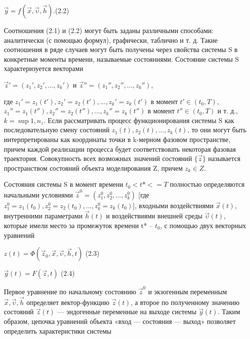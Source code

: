   \begin{center}
      $\vec{y} = f(\vec{x}, \vec{\upsilon}, \vec{h})$.(2.2)
  \end{center}

  Соотношения (2.1) и (2.2) могут быть заданы различными способами: аналитически (с помощью формул), графически, таблично и т. д. Такие соотношения в ряде случаев могут быть получены через свойства системы S в конкретные моменты времени, называемые состояниями. Состояние системы S характеризуется векторами

  \begin{center}
    $\vec{z}' = (z_{1}', z_{2}', ... , z_{k}')$ и $\vec{z}'' = (z_{1}'', z_{2}'', ... , z_{k}'')$,
  \end{center}


  где $z_{1}'= z_{1}(t'), z_{2}' = z_{2}(t'), ... , z_{k}' = z_{k}(t')$ в момент $t' \in (t_{0}, T)$, $z_{1}'' = z_{1}(t''), z_{2}'' = z_{2}(t''), ... , z_{k}'' = z_{k}(t'')$  в момент $t'' \in (t_{0}, T)$ и т. д., $k = \sup{1, n_{z}}$. Если рассматривать процесс функционирования системы S как последовательную смену состояний $z_{1}(t), z_{2}(t), ... , z_{k}(t)$, то они могут быть интерпретированы как координаты точки в k-мерном фазовом пространстве, причем каждой реализации процесса будет соответствовать некоторая фазовая траектория. Совокупность всех возможных значений состояний $\{\vec{z}\}$ называется пространством состояний объекта моделирования Z, причем $z_{k} \in Z$.

  Состояния системы S в момент времени $t_{0} < t* <= T $ полностью определяются начальными условиями $\vec{z}^{0} = (z^{0}_{1}, z^{0}_{2}, ... , z^{0}_{k})$ [где $z^{0}_{1} = z_{1}(t_{0}), z^{0}_{2} = z_{2}(t_{0}), ... , z^{0}_{k} = z_{k}(t_{0})$], входными воздействиями $\vec{x}(t)$, внутренними параметрами $\vec{h}(t)$ и воздействиями внешней среды $\vec{\upsilon}(t)$, которые имели место за промежуток времени t* -- $t_{0}$, с помощью двух векторных уравнений

  \begin{center}
     $z(t) = \Phi(\vec{z}_{0}, \vec{x}, \vec{\upsilon}, \vec{h}, t)$ (2.3)

     $\vec{y}(t) = F(\vec{z}, t)$ (2.4)
  \end{center}


  Первое уравнение по начальному состоянию $\vec{z}^{0}$ и экзогенным переменным $\vec{x}, \vec{\upsilon}, \vec{h}$ определяет вектор-функцию $\vec{z}(t)$, а второе по полученному значению состояний $\vec{z}(t)$ — эндогенные переменные на выходе системы $\vec{y}(t)$. Таким образом, цепочка уравнений объекта «вход — состояния — выход» позволяет определить характеристики системы

